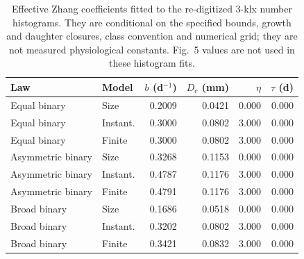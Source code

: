 \begin{table}[H]
\centering\footnotesize
\caption{Effective Zhang coefficients fitted to the re-digitized 3-klx number histograms. They are conditional on the specified bounds, growth and daughter closures, class convention and numerical grid; they are not measured physiological constants. Fig.~5 values are not used in these histogram fits.}
\label{tab:zhang-parameters}
\setlength{\tabcolsep}{3pt}
\begin{tabular}{llrrrr}
\toprule
Law & Model & $b$ (d$^{-1}$) & $D_c$ (mm) & $\eta$ & $\tau$ (d) \\
\midrule
Equal binary & Size & 0.2009 & 0.0421 & 0.000 & 0.000 \\
Equal binary & Instant. & 0.3000 & 0.0802 & 3.000 & 0.000 \\
Equal binary & Finite & 0.3000 & 0.0802 & 3.000 & 0.000 \\
Asymmetric binary & Size & 0.3268 & 0.1153 & 0.000 & 0.000 \\
Asymmetric binary & Instant. & 0.4787 & 0.1176 & 3.000 & 0.000 \\
Asymmetric binary & Finite & 0.4791 & 0.1176 & 3.000 & 0.000 \\
Broad binary & Size & 0.1686 & 0.0518 & 0.000 & 0.000 \\
Broad binary & Instant. & 0.3202 & 0.0802 & 3.000 & 0.000 \\
Broad binary & Finite & 0.3421 & 0.0832 & 3.000 & 0.000 \\
\bottomrule
\end{tabular}
\end{table}
